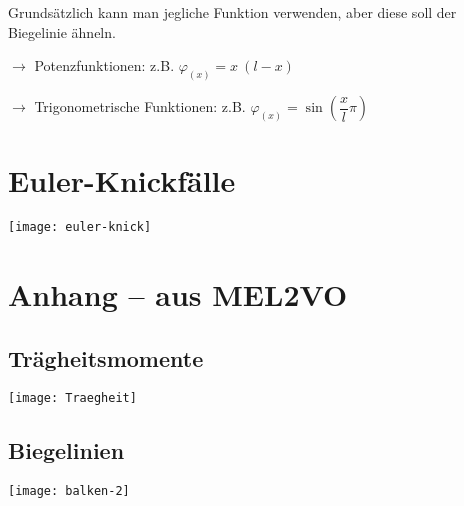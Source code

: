 	Grundsätzlich kann man jegliche Funktion verwenden, aber diese soll der Biegelinie ähneln.
	
	$\rightarrow$ Potenzfunktionen: z.B. $ \varphi_{(x)}=x\ (l-x) $

	$\rightarrow$ Trigonometrische Funktionen: z.B. $ \varphi_{(x)}=\sin{\left(\dfrac{x}{l}\pi\right)} $
	
\section{Euler-Knickfälle}
	\begin{center}
		\texttt{[image: euler-knick]}
	\end{center}

\section{Anhang -- aus MEL2VO}
\subsection{Trägheitsmomente}
	\begin{center}
		\texttt{[image: Traegheit]}
	\end{center}
	
\subsection{Biegelinien}
	\begin{center}
		\texttt{[image: balken-2]}
	\end{center}
